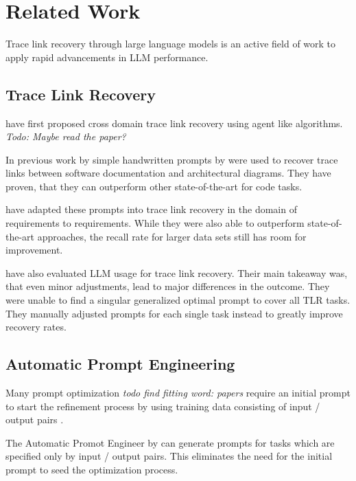 \chapter{Related Work}
Trace link recovery through large language models is an active field of work to apply rapid advancements in LLM performance.

\section{Trace Link Recovery}
 have first proposed cross domain trace link recovery using agent like algorithms. \textit{Todo: Maybe read the paper?}

In previous work by  simple handwritten prompts by  were used to recover trace links between software documentation and architectural diagrams. They have proven, that they can outperform other state-of-the-art for code tasks. 

 have adapted these prompts into trace link recovery in the domain of requirements to requirements. While they were also able to outperform state-of-the-art approaches, the recall rate for larger data sets still has room for improvement.

 have also evaluated LLM usage for trace link recovery. Their main takeaway was, that even minor adjustments,  lead to major differences in the outcome. They were unable to find a singular generalized optimal prompt to cover all TLR tasks. They manually adjusted prompts for each single task instead to greatly improve recovery rates.

\section{Automatic Prompt Engineering}
Many prompt optimization \textit{todo find fitting word: papers} require an initial prompt to start the refinement process by using training data consisting of input / output pairs \cite{ramnath_systematic_2025}.

The Automatic Promot Engineer by  can generate prompts for tasks which are specified only by input / output pairs. This eliminates the need for the initial prompt to seed the optimization process.

